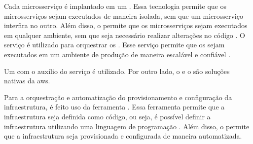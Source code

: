 Cada microsserviço é implantado em um  . Essa tecnologia permite que os microsserviços sejam executados de maneira isolada, sem que um microsserviço interfira no outro. Além disso, o  permite que os microsserviços sejam executados em qualquer ambiente, sem que seja necessário realizar alterações no código \cite{docker}. O serviço  é utilizado para orquestrar os  . Esse serviço permite que os  sejam executados em um ambiente de produção de maneira escalável e confiável \cite{amazonEcs}.

Um   com o auxílio do serviço  é utilizado. Por outro lado, o  e o  são soluções nativas da \acrshort{aws}.

Para a orquestração e automatização do provisionamento e configuração da infraestrutura, é feito uso da ferramenta . Essa ferramenta permite que a infraestrutura seja definida como código, ou seja, é possível definir a infraestrutura utilizando uma linguagem de programação \cite{terraform}. Além disso, o  permite que a infraestrutura seja provisionada e configurada de maneira automatizada.
